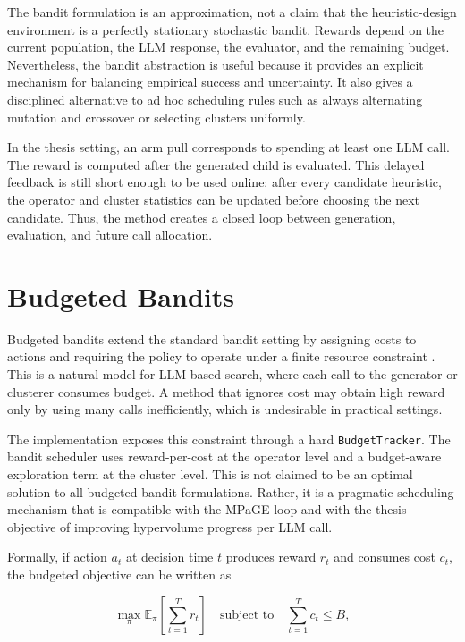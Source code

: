 \documentclass[../main.tex]{subfiles}
\begin{document}
The bandit formulation is an approximation, not a claim that the heuristic-design environment is a perfectly stationary stochastic bandit. Rewards depend on the current population, the LLM response, the evaluator, and the remaining budget. Nevertheless, the bandit abstraction is useful because it provides an explicit mechanism for balancing empirical success and uncertainty. It also gives a disciplined alternative to ad hoc scheduling rules such as always alternating mutation and crossover or selecting clusters uniformly.

In the thesis setting, an arm pull corresponds to spending at least one LLM call. The reward is computed after the generated child is evaluated. This delayed feedback is still short enough to be used online: after every candidate heuristic, the operator and cluster statistics can be updated before choosing the next candidate. Thus, the method creates a closed loop between generation, evaluation, and future call allocation.

\section{Budgeted Bandits}

Budgeted bandits extend the standard bandit setting by assigning costs to actions and requiring the policy to operate under a finite resource constraint \cite{ding2013budgeted}. This is a natural model for LLM-based search, where each call to the generator or clusterer consumes budget. A method that ignores cost may obtain high reward only by using many calls inefficiently, which is undesirable in practical settings.

The implementation exposes this constraint through a hard \texttt{BudgetTracker}. The bandit scheduler uses reward-per-cost at the operator level and a budget-aware exploration term at the cluster level. This is not claimed to be an optimal solution to all budgeted bandit formulations. Rather, it is a pragmatic scheduling mechanism that is compatible with the MPaGE loop and with the thesis objective of improving hypervolume progress per LLM call.

Formally, if action $a_t$ at decision time $t$ produces reward $r_t$ and consumes cost $c_t$, the budgeted objective can be written as

\begin{equation}
  \max_{\pi}
  \mathbb{E}_{\pi}
  \left[
    \sum_{t=1}^{T} r_t
  \right]
  \quad
  \text{subject to}
  \quad
  \sum_{t=1}^{T} c_t \le B,
\end{equation}
\end{document}
